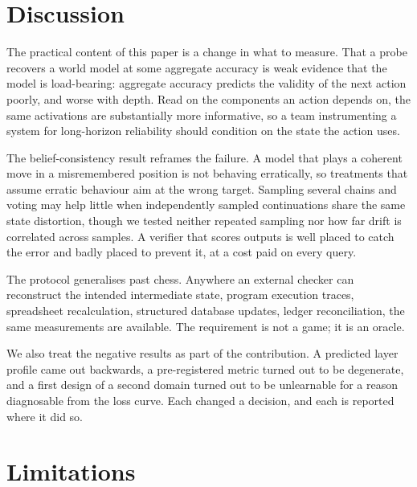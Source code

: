 \documentclass[manuscript, screen, review]{jair}
\theoremstyle{remark}
\begin{document}
\section{Discussion}

The practical content of this paper is a change in what to measure. That a probe
recovers a world model at some aggregate accuracy is weak evidence that the model
is load-bearing: aggregate accuracy predicts the validity of the next action
poorly, and worse with depth. Read on the components an action depends on, the
same activations are substantially more informative, so a team instrumenting a
system for long-horizon reliability should condition on the state the action
uses.

The belief-consistency result reframes the failure. A model that plays a coherent
move in a misremembered position is not behaving erratically, so treatments that
assume erratic behaviour aim at the wrong target. Sampling several chains and
voting may help little when independently sampled continuations share the same
state distortion, though we tested neither repeated sampling nor how far drift is
correlated across samples. A verifier that scores outputs is well placed to catch
the error and badly placed to prevent it, at a cost paid on every query.

The protocol generalises past chess. Anywhere an external checker can reconstruct
the intended intermediate state, program execution traces, spreadsheet
recalculation, structured database updates, ledger reconciliation, the same
measurements are available. The requirement is not a game; it is an oracle.

We also treat the negative results as part of the contribution. A predicted layer
profile came out backwards, a pre-registered metric turned out to be degenerate,
and a first design of a second domain turned out to be unlearnable for a reason
diagnosable from the loss curve. Each changed a decision, and each is reported
where it did so.

\section{Limitations}
\label{sec:limits}
\end{document}
